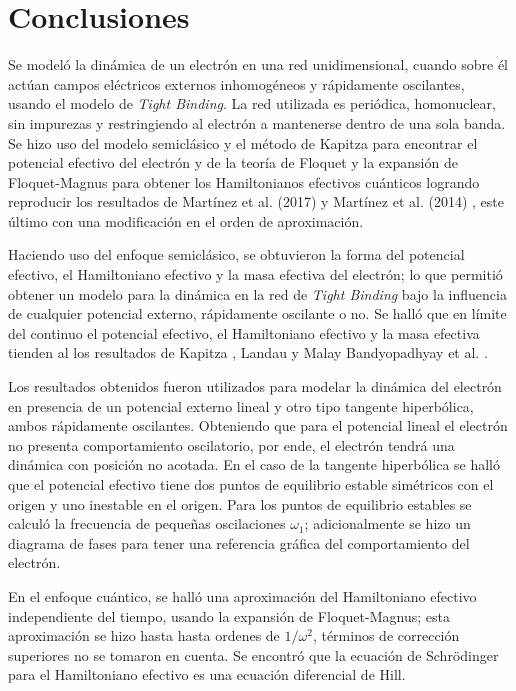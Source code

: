 \chapter*{Conclusiones}

 Se modeló la dinámica de un electrón en una red unidimensional, cuando sobre él actúan campos eléctricos externos inhomogéneos y rápidamente oscilantes, usando el modelo de \textit{Tight Binding}. La red utilizada es periódica, homonuclear, sin impurezas y restringiendo al electrón a mantenerse dentro de una sola banda. 
Se hizo uso del modelo semiclásico y el método de Kapitza para encontrar el potencial efectivo del electrón y de la teoría de Floquet y la expansión de Floquet-Magnus para obtener los  Hamiltonianos efectivos cuánticos logrando reproducir los resultados de Martínez et al. (2017) \cite{martinez2017} y Martínez et al. (2014) \cite{mart2014}, este último con una modificación en el orden de aproximación. 

Haciendo uso del enfoque semiclásico, se obtuvieron la forma del potencial efectivo, el Hamiltoniano efectivo y la masa efectiva del electrón; lo que permitió obtener un modelo para la dinámica en la red de \textit{Tight Binding} bajo la influencia de cualquier potencial externo, rápidamente oscilante o no. Se halló que en límite del continuo el potencial efectivo, el Hamiltoniano efectivo y la masa efectiva tienden al los resultados de Kapitza \cite{kapitza}, Landau \cite{landau} y Malay Bandyopadhyay et al. \cite{datta}.

Los resultados obtenidos fueron utilizados para modelar la dinámica del electrón en presencia de un potencial externo lineal y otro tipo tangente hiperbólica, ambos rápidamente oscilantes. Obteniendo que para el potencial lineal el electrón no presenta comportamiento oscilatorio, por ende, el electrón tendrá una dinámica con posición no acotada. En el caso de la tangente hiperbólica se halló que el potencial efectivo tiene dos puntos de equilibrio estable simétricos con el origen y uno inestable en el origen. Para los puntos de equilibrio estables se calculó la frecuencia de pequeñas oscilaciones $\omega_1$; adicionalmente se hizo un diagrama de fases para tener una referencia gráfica del comportamiento del electrón.

 En el enfoque cuántico, se halló una aproximación del Hamiltoniano efectivo independiente del tiempo, usando la expansión de Floquet-Magnus; esta aproximación se hizo hasta hasta ordenes de $1/\omega^2$, términos de corrección superiores no se tomaron en cuenta. Se encontró que la ecuación de Schrödinger para el Hamiltoniano efectivo es una ecuación diferencial de Hill. 
 
